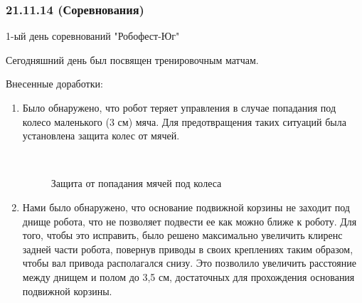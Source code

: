 \subsubsection{21.11.14 (Соревнования)}

\begin{center}
	1-ый день соревнований "Робофест-Юг"
\end{center}
Сегодняшний день был посвящен тренировочным матчам.\newline

Внесенные доработки:
\begin{enumerate}
	\item Было обнаружено, что  робот теряет управления в случае попадания под колесо маленького (3 см) мяча. Для предотвращения таких ситуаций была установлена защита колес от мячей.
	
	\begin{figure}[H]
		\begin{minipage}[h]{0.2\linewidth}
			\center  
		\end{minipage}
		\begin{minipage}[h]{0.6\linewidth}
			\caption{Защита от попадания мячей под колеса}
		\end{minipage}
	\end{figure}
	
	\item Нами было обнаружено, что основание подвижной корзины не заходит под днище робота, что не позволяет подвести ее как можно ближе к роботу. Для того, чтобы это исправить, было решено максимально увеличить клиренс задней части робота, повернув приводы в своих креплениях таким образом, чтобы вал привода располагался снизу. Это позволило увеличить расстояние между днищем и полом до 3,5 см, достаточных для прохождения основания подвижной корзины.
	

\end{enumerate}

